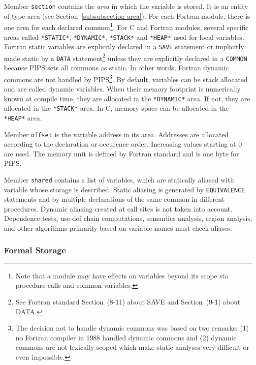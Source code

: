 \documentclass[a4paper]{article}
\begin{document}
Member \texttt{section} contains the \emph{area} in which the variable
is stored. It is an entity of type area (see
Section~\ref{subsubsection-area}). For each Fortran module, there is
one area for each declared common\footnote{Note that a module may have
  effects on variables beyond its scope via procedure calls and common
  variables.}. For C and Fortran modules, several specific areas
called \verb/*STATIC*/, \verb/*DYNAMIC*/, \verb/*STACK*/ and \verb/*HEAP*/
used for local variables. Fortran static variables are explicitly
declared in a \texttt{SAVE} statement or implicitly made static by a
\texttt{DATA} statement\footnote{See Fortran standard Section~(8-11)
  about SAVE and Section~(9-1) about DATA.} unless they are explicitly
declared in a \texttt{COMMON} because PIPS sets all commons as static.
In other words, Fortran dynamic commons are not handled by
PIPS\footnote{The decision not to handle dynamic commons was based on
  two remarks: (1) no Fortran compiler in 1988 handled dynamic commons
  and (2) dynamic commons are not lexically scoped which make static
  analyses very difficult or even impossible.}. By default, variables
can be stack allocated and are called dynamic variables. When their
memory footprint is numerically known at compile time, they are
allocated in the \verb/*DYNAMIC*/ area. If not, they are allocated in
the \verb/*STACK*/ area. In C, memory space can be allocated in the
\verb/ *HEAP*/ area.

Member \texttt{offset} is the variable address in its area. Addresses are
allocated according to the declaration or occurence order. Increasing
values starting at 0 are used. The memory unit is defined by Fortran
standard and is one byte for PIPS.

Member \texttt{shared} contains a list of variables, which are statically
aliased with variable whose storage is described. Static aliasing is
generated by \texttt{EQUIVALENCE} statements and by
multiple declarations of the same common in different
procedures. Dynamic aliasing created at call sites is not taken into
account. Dependence tests, use-def chain computations, semantics
analysis, region analysis, and other algorithms primarily based on
variable names must check aliases.

\subsubsection{Formal Storage}
\label{subsubsection-formal}
\end{document}

